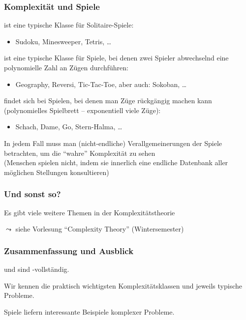 \documentclass[aspectratio=1610,onlymath]{beamer}
\begin{document}
\begin{frame}\frametitle{Komplexität und Spiele}

\alert{\NP} ist eine typische Klasse für Solitaire-Spiele:
\begin{itemize}
\item Sudoku, Minesweeper, Tetris, \ldots
\end{itemize}
\bigskip\pause

\alert{\PSpace} ist eine typische Klasse für Spiele, bei denen zwei Spieler
abwechselnd eine polynomielle Zahl an Zügen durchführen:
\begin{itemize}
\item Geography, Reversi, Tic-Tac-Toe, aber auch: Sokoban, \ldots
\end{itemize}
\bigskip\pause

\alert{\ExpTime} findet sich bei Spielen, bei denen man Züge rückgängig machen kann (polynomielles Spielbrett -- exponentiell viele Züge):
\begin{itemize}
\item Schach, Dame, Go, Stern-Halma, \ldots
\end{itemize}
\smallskip

In jedem Fall muss man (nicht-endliche) Verallgemeinerungen der Spiele betrachten,
um die "`wahre"' Komplexität zu sehen\\ {\tiny(Menschen spielen nicht, indem sie
innerlich eine endliche Datenbank aller möglichen Stellungen konsultieren)}
\smallskip\pause



\end{frame}

\begin{frame}\frametitle{Und sonst so?}

Es gibt viele weitere Themen in der Komplexitätstheorie
\bigskip

$\leadsto$ siehe Vorlesung "`Complexity Theory"' (Wintersemester)

\end{frame}


\begin{frame}\frametitle{Zusammenfassung und Ausblick}

 und  sind \PSpace-vollständig.
\bigskip

Wir kennen die praktisch wichtigsten Komplexitätsklassen und jeweils typische Probleme.
\bigskip

Spiele liefern interessante Beispiele komplexer Probleme.
\bigskip


\end{frame}
\end{document}
